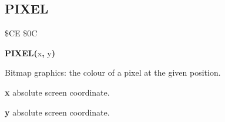 \newpage
\subsection{PIXEL}
\begin{description}[leftmargin=2cm,style=nextline]
\item [Token:] \$CE \$0C
\item [Format:] {\bf PIXEL(}x{\bf,} y{\bf)}
\item [Returns:] Bitmap graphics: the colour of a pixel at the given position.

               {\bf x} absolute screen coordinate.

               {\bf y} absolute screen coordinate.
\end{description}



\newpage
